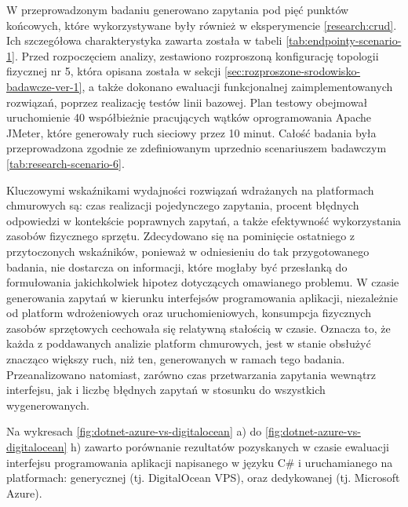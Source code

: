 W przeprowadzonym badaniu generowano zapytania pod pięć punktów końcowych, które wykorzystywane były również w eksperymencie \ref{research:crud}. Ich szczegółowa charakterystyka zawarta została w tabeli \ref{tab:endpointy-scenario-1}. Przed rozpoczęciem analizy, zestawiono rozproszoną konfigurację topologii fizycznej nr 5, która opisana została w sekcji \ref{sec:rozproszone-srodowisko-badawcze-ver-1}, a także dokonano ewaluacji funkcjonalnej zaimplementowanych rozwiązań, poprzez realizację testów linii bazowej. Plan testowy obejmował uruchomienie 40 współbieżnie pracujących wątków oprogramowania Apache JMeter, które generowały ruch sieciowy przez 10 minut. Całość badania była przeprowadzona zgodnie ze zdefiniowanym uprzednio scenariuszem badawczym \ref{tab:research-scenario-6}.

Kluczowymi wskaźnikami wydajności rozwiązań wdrażanych na platformach chmurowych są: czas realizacji pojedynczego zapytania, procent błędnych odpowiedzi w kontekście poprawnych zapytań, a także efektywność wykorzystania zasobów fizycznego sprzętu. Zdecydowano się na pominięcie ostatniego z przytoczonych wskaźników, ponieważ w odniesieniu do tak przygotowanego badania, nie dostarcza on informacji, które mogłaby być przesłanką do formułowania jakichkolwiek hipotez dotyczących omawianego problemu. W czasie generowania zapytań w kierunku interfejsów programowania aplikacji, niezależnie od platform wdrożeniowych oraz uruchomieniowych, konsumpcja fizycznych zasobów sprzętowych cechowała się relatywną stałością w czasie. Oznacza to, że każda z poddawanych analizie platform chmurowych, jest w stanie obsłużyć znacząco większy ruch, niż ten, generowanych w ramach tego badania. Przeanalizowano natomiast, zarówno czas przetwarzania zapytania wewnątrz interfejsu, jak i liczbę błędnych zapytań w stosunku do wszystkich wygenerowanych.     

Na wykresach \ref{fig:dotnet-azure-vs-digitalocean} a) do \ref{fig:dotnet-azure-vs-digitalocean} h) zawarto porównanie rezultatów pozyskanych w czasie ewaluacji interfejsu programowania aplikacji napisanego w języku C\# i uruchamianego na platformach: generycznej (tj. DigitalOcean VPS), oraz dedykowanej (tj. Microsoft Azure).

